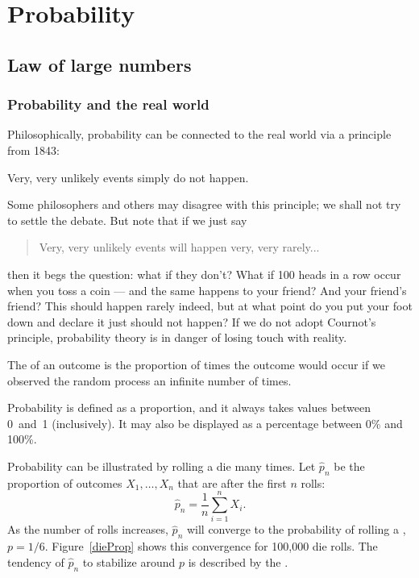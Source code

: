 \chapter{Probability}
\label{probability}


\section{Law of large numbers}

\subsection{Probability and the real world}
Philosophically, probability can be connected to the real world via a principle from 1843:


\begin{termBox}{
Very, very unlikely events simply do not happen.}
\end{termBox}


Some philosophers and others may disagree with this principle; we shall not try to settle the debate. But note that if we just say
\begin{quote}
	Very, very unlikely events will happen very, very rarely...
\end{quote}
then it begs the question: what if they don't? What if 100 heads in a row occur when you toss a coin --- and the same happens to your friend? And your friend's friend? This should happen rarely indeed, but at what point do you put your foot down and declare it just should not happen? If we do not adopt Cournot's principle, probability theory is in danger of losing touch with reality.



\begin{termBox}{
The  of an outcome is the proportion of times the outcome would occur if we observed the random process an infinite number of times.}
\end{termBox}

Probability is defined as a proportion, and it always takes values between 0~and~1 (inclusively). It may also be displayed as a percentage between 0\% and 100\%.

Probability can be illustrated by rolling a die many times. Let $\hat{p}_n$ be the proportion of outcomes $X_1,\dots,X_n$ that are  after the first $n$ rolls:
\[
\hat p_n = \frac1n\sum_{i=1}^n X_i.
\]
As the number of rolls increases, $\hat{p}_n$ will converge to the probability of rolling a , $p = 1/6$. Figure~\ref{dieProp} shows this convergence for 100,000 die rolls. The tendency of $\hat{p}_n$ to stabilize around $p$ is described by the . 

